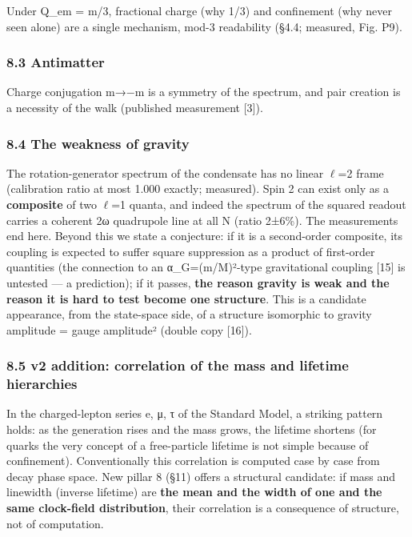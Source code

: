\documentclass[
]{article}
\begin{document}
Under Q\_em = m/3, fractional charge (why 1/3) and confinement (why
never seen alone) are a single mechanism, mod-3 readability (§4.4;
measured, Fig. P9).

\subsubsection{8.3 Antimatter}\label{antimatter}

Charge conjugation m→−m is a symmetry of the spectrum, and pair creation
is a necessity of the walk (published measurement {[}3{]}).

\subsubsection{8.4 The weakness of
gravity}\label{the-weakness-of-gravity}

The rotation-generator spectrum of the condensate has no linear
\(\ell\)=2 frame (calibration ratio at most 1.000 exactly; measured).
Spin 2 can exist only as a \textbf{composite} of two \(\ell\)=1 quanta,
and indeed the spectrum of the squared readout carries a coherent 2ω
quadrupole line at all N (ratio 2±6\%). The measurements end here.
Beyond this we state a conjecture: if it is a second-order composite,
its coupling is expected to suffer square suppression as a product of
first-order quantities (the connection to an α\_G=(m/M)²-type
gravitational coupling {[}15{]} is untested --- a prediction); if it
passes, \textbf{the reason gravity is weak and the reason it is hard to
test become one structure}. This is a candidate appearance, from the
state-space side, of a structure isomorphic to gravity amplitude = gauge
amplitude² (double copy {[}16{]}).

\subsubsection{8.5 v2 addition: correlation of the mass and lifetime
hierarchies}\label{v2-addition-correlation-of-the-mass-and-lifetime-hierarchies}

In the charged-lepton series e, μ, τ of the Standard Model, a striking
pattern holds: as the generation rises and the mass grows, the lifetime
shortens (for quarks the very concept of a free-particle lifetime is not
simple because of confinement). Conventionally this correlation is
computed case by case from decay phase space. New pillar 8 (§11) offers
a structural candidate: if mass and linewidth (inverse lifetime) are
\textbf{the mean and the width of one and the same clock-field
distribution}, their correlation is a consequence of structure, not of
computation.
\end{document}
